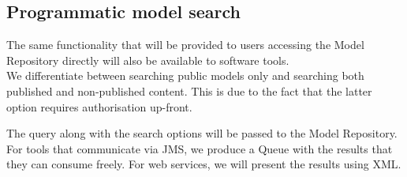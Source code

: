 \subsection{Programmatic model search}
The same functionality that will be provided to users accessing the \ddmore Model Repository directly will also be available to software tools. \\
We differentiate between searching public models only and searching both published and non-published content. This is due to the fact that the latter option requires authorisation up-front. 

\begin{techNote}
The query along with the search options will be passed to the Model Repository. For tools that communicate via JMS, we produce a Queue with the results that they can consume freely. For web services, we will present the results using XML. 
\end{techNote}

%
